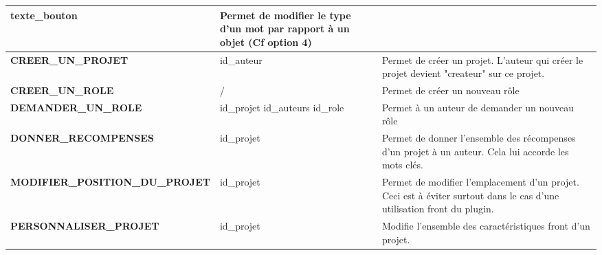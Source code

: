 \begin{tabular}{|>{\centering\arraybackslash}m{6.2cm}|>{\centering\arraybackslash}m{3cm}|>{\centering\arraybackslash}m{6cm}|}
    texte\_bouton
    & Permet de modifier le type d'un mot par rapport à un objet (Cf option 4)\\ 
    \hline
    \textbf{CREER\_UN\_PROJET} & id\_auteur & Permet de créer un projet. L'auteur qui créer le projet devient "createur" sur ce projet.\\
    \hline
    \textbf{CREER\_UN\_ROLE} & / & Permet de créer un nouveau rôle\\
    \hline
    \textbf{DEMANDER\_UN\_ROLE} & 
    id\_projet
    \newline
    id\_auteurs
    \newline
    id\_role
     & Permet à un auteur de demander un nouveau rôle\\
    \hline
    \textbf{DONNER\_RECOMPENSES} & 
    id\_projet
    & Permet de donner l'ensemble des récompenses d'un projet à un auteur. Cela lui accorde les mots clés.\\
    \hline
    \textbf{MODIFIER\_POSITION\_DU\_PROJET} & 
    id\_projet
    & Permet de modifier l'emplacement d'un projet. Ceci est à éviter surtout dans le cas d'une utilisation front du plugin.\\
    \hline
    \textbf{PERSONNALISER\_PROJET} & 
    id\_projet
    & Modifie l'ensemble des caractéristiques front d'un projet.\\
    \hline
\end{tabular}

\newpage

\vspace{0.5cm}


